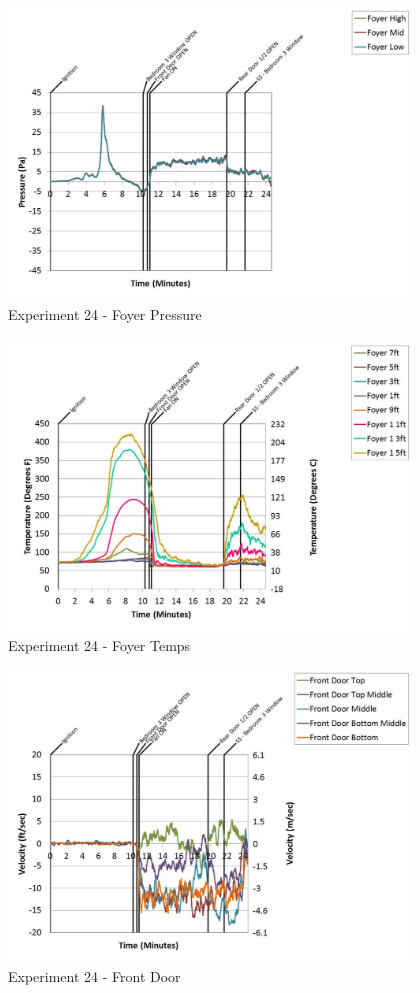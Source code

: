 \documentclass{article}
\begin{document}
\begin{appendices}
	\begin{figure}[h!]
		\centering
		\includegraphics[height=3.05in]{0_Images/Results_Charts/Exp_24_Charts/FoyerPressure.pdf}
		\caption{Experiment 24 - Foyer Pressure}
	\end{figure}
 
	\clearpage

	\begin{figure}[h!]
		\centering
		\includegraphics[height=3.05in]{0_Images/Results_Charts/Exp_24_Charts/FoyerTemps.pdf}
		\caption{Experiment 24 - Foyer Temps}
	\end{figure}
 

	\begin{figure}[h!]
		\centering
		\includegraphics[height=3.05in]{0_Images/Results_Charts/Exp_24_Charts/FrontDoor.pdf}
		\caption{Experiment 24 - Front Door}
	\end{figure}
 

\end{appendices}
\end{document}
